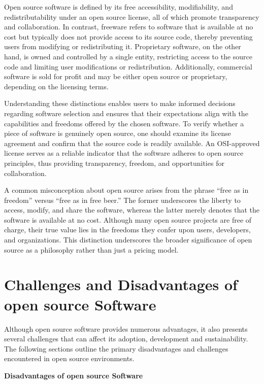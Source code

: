 Open source software is defined by its free accessibility, modifiability, and redistributability under an open source license, 
all of which promote transparency and collaboration. In contrast, freeware refers to software that is available at no cost but typically does not provide access to 
its source code, thereby preventing users from modifying or redistributing it. Proprietary software, 
on the other hand, is owned and controlled by a single entity, restricting access to the source code and limiting user modifications or redistribution. 
Additionally, commercial software is sold for profit and may be either open source or proprietary, depending on the licensing terms.

Understanding these distinctions enables users to make informed decisions regarding software selection and ensures that their expectations align with the capabilities and 
freedoms offered by the chosen software. To verify whether a piece of software is genuinely open source, one should examine its license agreement and confirm that the source 
code is readily available. An OSI-approved license serves as a reliable indicator that the software adheres to open source principles, 
thus providing transparency, freedom, and opportunities for collaboration.

A common misconception about open source arises from the phrase “free as in freedom” versus “free as in free beer.” The former underscores the liberty to access, modify, 
and share the software, whereas the latter merely denotes that the software is available at no cost. Although many open source projects are free of charge, 
their true value lies in the freedoms they confer upon users, developers, and organizations. This distinction underscores the broader significance of open source as a 
philosophy rather than just a pricing model.

\cite{forbes_misconceptions_open_source_2024}

\section{Challenges and Disadvantages of open source Software}

Although open source software provides numerous advantages, it also presents several challenges that can affect its adoption, development and sustainability. The following sections outline the primary disadvantages and challenges encountered in open source environments.

\textbf{Disadvantages of open source Software}


